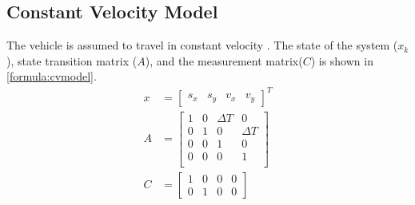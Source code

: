 \subsection{Constant Velocity Model}
The vehicle is assumed to travel in constant velocity \cite{Schubert2008}. The state of the system ($x_k$), state transition matrix ($A$), and the measurement matrix($C$) is shown in \eqref{formula:cvmodel}.
\begin{equation}
\label{formula:cvmodel}
\begin{split}
x &=
\left[\begin{matrix}
s_x & s_y & v_x & v_y
\end{matrix}\right]^{T}\\
A&= \left[\begin{matrix}
1 & 0 & \Delta T & 0\\
0 & 1 & 0 & \Delta T\\
0 & 0 & 1 & 0\\
0 & 0 & 0 & 1\\
\end{matrix}\right]\\
C&= \left[\begin{matrix}
1 & 0 & 0 & 0\\
0 & 1 & 0 & 0
\end{matrix}\right]
\end{split}
\end{equation}


